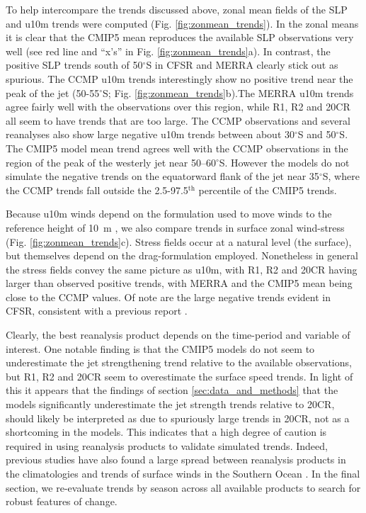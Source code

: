 \documentclass{ametsoc}
\begin{document}
To help intercompare the trends discussed above, zonal mean fields of the SLP and u10m trends were
computed (Fig. \ref{fig:zonmean_trends}). In the zonal means it is clear that the CMIP5 mean reproduces
the available SLP observations very well (see red line and ``x's'' in Fig. \ref{fig:zonmean_trends}a). 
In contrast, the positive SLP trends south of 50$^{\circ}$S in
CFSR and MERRA clearly stick out as spurious. The CCMP u10m trends interestingly show no positive
trend near the peak of the jet (50-55$^{\circ}$S; Fig. \ref{fig:zonmean_trends}b).The  MERRA u10m 
trends agree fairly well with the
observations over this region, while R1, R2 and 20CR all seem to have trends that are too large.
The CCMP observations and several reanalyses also show large negative u10m trends between about 
30$^{\circ}$S and 50$^{\circ}$S. The CMIP5 model mean trend agrees well with the CCMP observations
in the region of the peak of the westerly jet near 50--60$^{\circ}$S. However the models do not
simulate the negative trends on the equatorward flank of the jet near 35$^{\circ}$S, where the CCMP 
trends fall outside the 2.5-97.5$^\textrm{th}$ percentile of the CMIP5 trends.

Because u10m winds depend on the formulation used to move winds to the reference height of 10~m
\citep{Kent_et_al_2013}, we also compare trends in surface zonal wind-stress
(Fig. \ref{fig:zonmean_trends}c). Stress fields occur at a natural level (the surface), 
but themselves depend on the drag-formulation employed. Nonetheless in general the stress fields 
convey the same picture as u10m, with R1, R2 and 20CR having
larger than observed positive trends, with MERRA and the CMIP5 mean being close to the CCMP values. 
Of note are the large negative trends evident in CFSR, consistent with a previous report 
\citep{Swart_et_al_2014}.

Clearly, the best reanalysis product depends on the time-period and variable of interest. One notable
finding is that the CMIP5 models do not seem to underestimate the jet strengthening trend relative to
the available observations, but R1, R2 and 20CR seem to overestimate the surface speed trends. In light
of this it appears that the findings of section \ref{sec:data_and_methods} that the models significantly
underestimate the jet strength trends relative to 20CR, should likely be interpreted as due to 
spuriously large trends in 20CR, not as a shortcoming in the models. This indicates that a high degree 
of caution is required in using reanalysis products to validate simulated trends. Indeed, previous studies
have also found a large spread between reanalysis products in the climatologies and 
trends of surface winds in the Southern Ocean \citep{Kent_et_al_2013, Li_et_al_2013}. In the final
section, we re-evaluate trends by season across all available products to search for robust
features of change.
\end{document}
